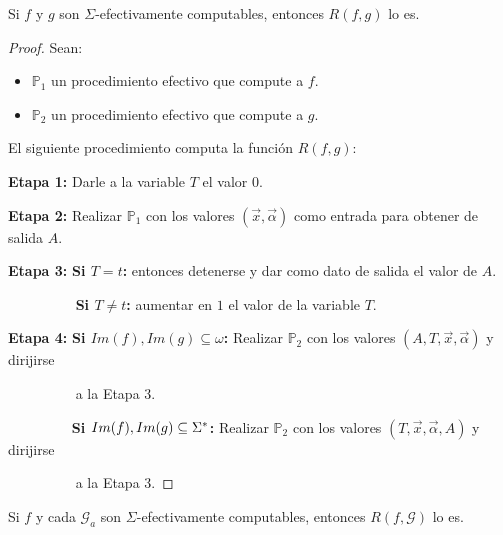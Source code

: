   \begin{lemma}
    \par Si $f$ y $g$ son $\Sigma $-efectivamente computables, entonces $R(f,g)$ lo es.
  \end{lemma}
  \begin{proof}
    \par Sean:

    \begin{itemize}
      \item $\mathbb{P}_{1}$ un procedimiento efectivo que compute a $f$.
      \item $\mathbb{P}_{2}$ un procedimiento efectivo que compute a $g$.
    \end{itemize}

    \par El siguiente procedimiento computa la función $R(f,g)$:

    \vspace{3mm}
    \textbf{Etapa 1:}
    Darle a la variable $T$ el valor $0$.

    \textbf{Etapa 2:}
    Realizar $\mathbb{P}_{1}$ con los valores $(\vec{x}, \vec{\alpha})$ como entrada para obtener de salida $A$.

    \textbf{Etapa 3:}
    \textbf{Si $T = t$:} entonces detenerse y dar como dato de salida el valor de $A$.

    $\qquad\qquad\;\;\;$\textbf{Si $T \neq t$:} aumentar en $1$ el valor de la variable $T$.

    \textbf{Etapa 4:}
    \textbf{Si $Im(f), Im(g) \subseteq \omega$:} Realizar $\mathbb{P}_{2}$ con los valores $(A, T, \vec{x},
    \vec{\alpha})$ y dirijirse

    $\qquad\qquad\;\;\;$a la Etapa 3.

    $\qquad\qquad\;\;$\textbf{Si $Im(f), Im(g) \subseteq \Sigma^{\ast}$:} Realizar $\mathbb{P}_{2}$ con los valores $(T,
    \vec{x}, \vec{\alpha}, A)$ y dirijirse

    $\qquad\qquad\;\;\;$a la Etapa 3.
  \end{proof}

  \begin{lemma}
    \par Si $f$ y cada $\mathcal{G}_{a}$ son $\Sigma$-efectivamente computables, entonces $R(f, \mathcal{G})$ lo es.
  \end{lemma}

